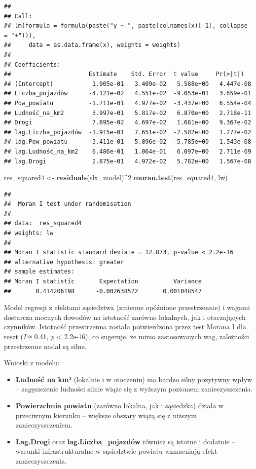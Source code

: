 \documentclass[
  11pt,
]{article}
\newenvironment{Shaded}{\begin{snugshade}}{\end{snugshade}}
\newcommand{\DecValTok}[1]{\textcolor[rgb]{0.00,0.00,0.81}{#1}}
\newcommand{\FunctionTok}[1]{\textcolor[rgb]{0.13,0.29,0.53}{\textbf{#1}}}
\newcommand{\NormalTok}[1]{#1}
\newcommand{\OtherTok}[1]{\textcolor[rgb]{0.56,0.35,0.01}{#1}}
\newcommand{\SpecialCharTok}[1]{\textcolor[rgb]{0.81,0.36,0.00}{\textbf{#1}}}
\begin{document}
\begin{verbatim}
## 
## Call:
## lm(formula = formula(paste("y ~ ", paste(colnames(x)[-1], collapse = "+"))), 
##     data = as.data.frame(x), weights = weights)
## 
## Coefficients:
##                      Estimate    Std. Error  t value     Pr(>|t|)  
## (Intercept)           1.905e-01   3.409e-02   5.588e+00   4.447e-08
## Liczba_pojazdów      -4.121e-02   4.551e-02  -9.053e-01   3.659e-01
## Pow_powiatu          -1.711e-01   4.977e-02  -3.437e+00   6.554e-04
## Ludność_na_km2        3.997e-01   5.817e-02   6.870e+00   2.718e-11
## Drogi                 7.895e-02   4.697e-02   1.681e+00   9.367e-02
## lag.Liczba_pojazdów  -1.915e-01   7.651e-02  -2.502e+00   1.277e-02
## lag.Pow_powiatu      -3.411e-01   5.896e-02  -5.785e+00   1.543e-08
## lag.Ludność_na_km2    6.486e-01   1.064e-01   6.097e+00   2.711e-09
## lag.Drogi             2.875e-01   4.972e-02   5.782e+00   1.567e-08
\end{verbatim}

\begin{Shaded}
\begin{Highlighting}[]
\NormalTok{res\_squared4 }\OtherTok{\textless{}{-}} \FunctionTok{residuals}\NormalTok{(slx\_model)}\SpecialCharTok{\^{}}\DecValTok{2}
\FunctionTok{moran.test}\NormalTok{(res\_squared4, lw)}
\end{Highlighting}
\end{Shaded}

\begin{verbatim}
## 
##  Moran I test under randomisation
## 
## data:  res_squared4  
## weights: lw    
## 
## Moran I statistic standard deviate = 12.873, p-value < 2.2e-16
## alternative hypothesis: greater
## sample estimates:
## Moran I statistic       Expectation          Variance 
##       0.414206198      -0.002638522       0.001048547
\end{verbatim}

Model regresji z efektami sąsiedztwa (zmienne opóźnione przestrzennie) i
wagami dostarcza mocnych dowodów na istotność zarówno lokalnych, jak i
otaczających czynników. Istotność przestrzenna została potwierdzona
przez test Morana I dla reszt (\emph{I} ≈ 0.41, \emph{p} \textless{}
2.2e-16), co sugeruje, że mimo zastosowanych wag, zależności
przestrzenne nadal są silne.

Wnioski z modelu:

\begin{itemize}
\item
  \textbf{Ludność na km²} (lokalnie i w otoczeniu) ma bardzo silny
  pozytywny wpływ -- zagęszczenie ludności silnie wiąże się z wyższym
  poziomem zanieczyszczenia.
\item
  \textbf{Powierzchnia powiatu} (zarówno lokalna, jak i sąsiedzka)
  działa w przeciwnym kierunku -- większe obszary wiążą się z niższym
  zanieczyszczeniem.
\item
  \textbf{Lag.Drogi} oraz \textbf{lag.Liczba\_pojazdów} również są
  istotne i dodatnie -- warunki infrastrukturalne w sąsiedztwie powiatu
  wzmacniają efekt zanieczyszczenia.
\end{itemize}
\end{document}

